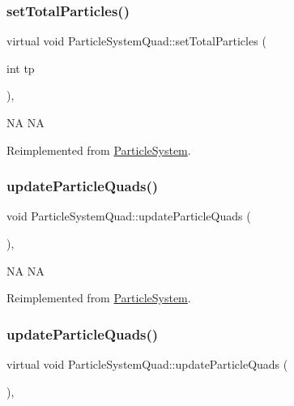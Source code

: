 \subsubsection{\texorpdfstring{set\+Total\+Particles()}{setTotalParticles()}\hspace{0.1cm}{\footnotesize\ttfamily [2/2]}}
{\footnotesize\ttfamily virtual void Particle\+System\+Quad\+::set\+Total\+Particles (\begin{DoxyParamCaption}\item[{int}]{tp }\end{DoxyParamCaption})\hspace{0.3cm}{\ttfamily [override]}, {\ttfamily [virtual]}}

NA  NA 

Reimplemented from \hyperlink{classParticleSystem_ad406c6892022b3ec0173f1c940055ed3}{Particle\+System}.

\mbox{\label{classParticleSystemQuad_a4f73ff1d0afde788ba41f0bcbe8dd9d5}} 
\subsubsection{\texorpdfstring{update\+Particle\+Quads()}{updateParticleQuads()}\hspace{0.1cm}{\footnotesize\ttfamily [1/2]}}
{\footnotesize\ttfamily void Particle\+System\+Quad\+::update\+Particle\+Quads (\begin{DoxyParamCaption}{ }\end{DoxyParamCaption})\hspace{0.3cm}{\ttfamily [override]}, {\ttfamily [virtual]}}

NA  NA 

Reimplemented from \hyperlink{classParticleSystem_a77929b8f9b3aca5d81362d3c3d80e378}{Particle\+System}.

\mbox{\label{classParticleSystemQuad_aaa4944b341aea804011cc17160a59068}} 
\subsubsection{\texorpdfstring{update\+Particle\+Quads()}{updateParticleQuads()}\hspace{0.1cm}{\footnotesize\ttfamily [2/2]}}
{\footnotesize\ttfamily virtual void Particle\+System\+Quad\+::update\+Particle\+Quads (\begin{DoxyParamCaption}{ }\end{DoxyParamCaption})\hspace{0.3cm}{\ttfamily [override]}, {\ttfamily [virtual]}}

